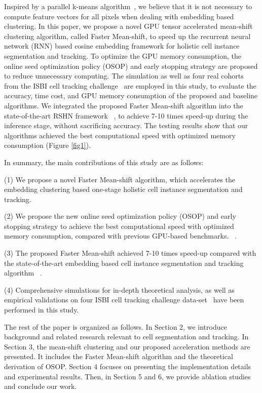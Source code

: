 \documentclass[journal,twoside,web]{ieeecolor}
\begin{document}
Inspired by a parallel k-means algorithm~\cite{b37}, we believe that it is not necessary to compute feature vectors for all pixels when dealing with embedding based clustering. In this paper, we propose a novel GPU tensor accelerated mean-shift clustering algorithm, called Faster Mean-shift, to speed up the recurrent neural network (RNN) based cosine embedding framework for holistic cell instance segmentation and tracking. To optimize the GPU memory consumption, the online seed optimization policy (OSOP) and early stopping strategy are proposed to reduce unnecessary computing. The simulation as well as four real cohorts from the ISBI cell tracking challenge~\cite{b20} are employed in this study, to evaluate the accuracy, time cost, and GPU memory consumption of the proposed and baseline algorithms. We integrated the proposed Faster Mean-shift algorithm into the state-of-the-art RSHN framework ~\cite{b15}, to achieve 7-10 times speed-up during the inference stage, without sacrificing accuracy. The testing results show that our algorithms achieved the best computational speed with optimized memory consumption (Figure \ref{fig1}).

In summary, the main contributions of this study are as follows:

(1) We propose a novel Faster Mean-shift algorithm, which accelerates the embedding clustering based one-stage holistic cell instance segmentation and tracking.

(2) We propose the new online seed optimization policy (OSOP) and early stopping strategy to achieve the best computational speed with optimized memory consumption, compared with previous GPU-based benchmarks. ~\cite{b18,b19}.

(3) The proposed Faster Mean-shift achieved 7-10 times speed-up compared with the state-of-the-art embedding based cell instance segmentation and tracking algorithm ~\cite{b15}.

(4) Comprehensive simulations for in-depth theoretical analysis, as well as empirical validations on four ISBI cell tracking challenge data-set~\cite{b20} have been performed in this study.

The rest of the paper is organized as follows. In Section 2, we introduce background and related research relevant to cell segmentation and tracking. In Section 3, the mean-shift clustering and our proposed acceleration methods are presented. It includes the Faster Mean-shift algorithm and the theoretical derivation of OSOP. Section 4 focuses on presenting the implementation details and experimental results. Then, in Section 5 and 6, we provide ablation studies and conclude our work.
\end{document}
